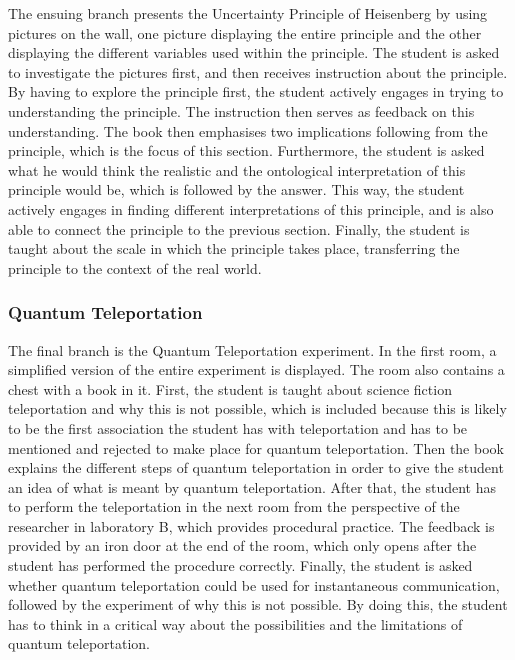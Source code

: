 \documentclass[11pt,twoside]{report} %
\begin{document}
The ensuing branch presents the Uncertainty Principle of Heisenberg by using pictures on the wall, one picture displaying the entire principle and the other displaying the different variables used within the principle. The student is asked to investigate the pictures first, and then receives instruction about the principle. By having to explore the principle first, the student actively engages in trying to understanding the principle. The instruction then serves as feedback on this understanding. The book then emphasises two implications following from the principle, which is the focus of this section. Furthermore, the student is asked what he would think the realistic and the ontological interpretation of this principle would be, which is followed by the answer. This way, the student actively engages in finding different interpretations of this principle, and is also able to connect the principle to the previous section. Finally, the student is taught about the scale in which the principle takes place, transferring the principle to the context of the real world.

\subsubsection{Quantum Teleportation}

The final branch is the Quantum Teleportation experiment. In the first room, a simplified version of the entire experiment is displayed. The room also contains a chest with a book in it. First, the student is taught about science fiction teleportation and why this is not possible, which is included because this is likely to be the first association the student has with teleportation and has to be mentioned and rejected to make place for quantum teleportation. Then the book explains the different steps of quantum teleportation in order to give the student an idea of what is meant by quantum teleportation. After that, the student has to perform the teleportation in the next room from the perspective of the researcher in laboratory B, which provides procedural practice. The feedback is provided by an iron door at the end of the room, which only opens after the student has performed the procedure correctly. Finally, the student is asked whether quantum teleportation could be used for instantaneous communication, followed by the experiment of why this is not possible. By doing this, the student has to think in a critical way about the possibilities and the limitations of quantum teleportation.
\end{document}
